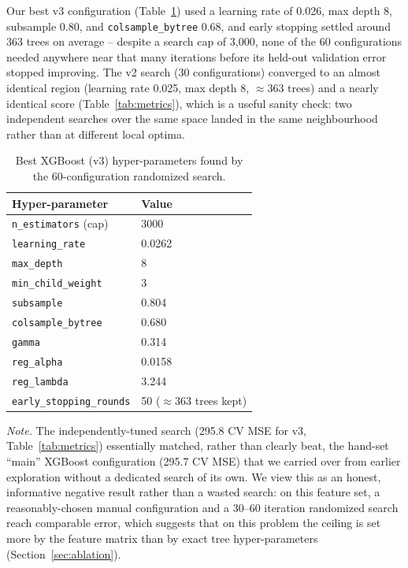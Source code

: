 \documentclass[journal]{IEEEtran}
\begin{document}
Our best v3 configuration (Table~\ref{tab:xgbparams}) used a learning rate of
0.026, max depth 8, subsample 0.80, and \texttt{colsample\_bytree} 0.68, and
early stopping settled around 363 trees on average -- despite a search cap of
3{,}000, none of the 60 configurations needed anywhere near that many
iterations before its held-out validation error stopped improving. The v2
search (30 configurations) converged to an almost identical region (learning
rate 0.025, max depth 8, $\approx$363 trees) and a nearly identical score
(Table~\ref{tab:metrics}), which is a useful sanity check: two independent
searches over the same space landed in the same neighbourhood rather than at
different local optima.

\begin{table}[!t]
\caption{Best XGBoost (v3) hyper-parameters found by the 60-configuration
randomized search.}
\label{tab:xgbparams}
\centering
\begin{tabular}{ll}
\toprule
Hyper-parameter & Value \\
\midrule
\texttt{n\_estimators} (cap) & 3000 \\
\texttt{learning\_rate} & 0.0262 \\
\texttt{max\_depth} & 8 \\
\texttt{min\_child\_weight} & 3 \\
\texttt{subsample} & 0.804 \\
\texttt{colsample\_bytree} & 0.680 \\
\texttt{gamma} & 0.314 \\
\texttt{reg\_alpha} & 0.0158 \\
\texttt{reg\_lambda} & 3.244 \\
\texttt{early\_stopping\_rounds} & 50 ($\approx$363 trees kept) \\
\bottomrule
\end{tabular}
\end{table}

\noindent\emph{Note.} The independently-tuned search (295.8 CV MSE for v3,
Table~\ref{tab:metrics}) essentially matched, rather than clearly beat, the
hand-set ``main'' XGBoost configuration (295.7 CV MSE) that we carried over
from earlier exploration without a dedicated search of its own. We view this as
an honest, informative negative result rather than a wasted search: on this
feature set, a reasonably-chosen manual configuration and a 30--60 iteration
randomized search reach comparable error, which suggests that on this problem
the ceiling is set more by the feature matrix than by exact tree
hyper-parameters (Section~\ref{sec:ablation}).
\end{document}

